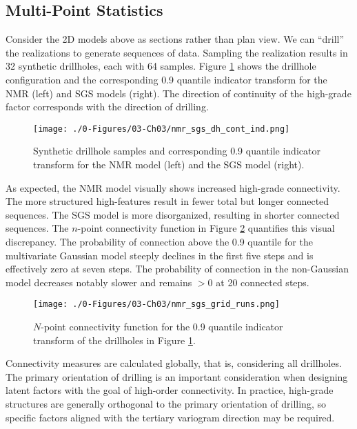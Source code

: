 \subsection{Multi-Point Statistics}
\label{subsec:03multipt}

Consider the \gls{2D} models above as sections rather than plan view. We can ``drill'' the realizations to generate sequences of data. Sampling the realization results in 32 synthetic drillholes, each with 64 samples. Figure \ref{fig:nmr_sgs_dh_cont_ind} shows the drillhole configuration and the corresponding 0.9 quantile indicator transform for the \gls{NMR} (left) and \gls{SGS} models (right). The direction of continuity of the high-grade factor corresponds with the direction of drilling.

\begin{figure}[htb!]
    \centering
    \texttt{[image: ./0-Figures/03-Ch03/nmr\_sgs\_dh\_cont\_ind.png]}
    \caption{ Synthetic drillhole samples and corresponding 0.9 quantile indicator transform for the \gls{NMR} model (left) and the \gls{SGS} model (right).}
    \label{fig:nmr_sgs_dh_cont_ind}
\end{figure}

As expected, the \gls{NMR} model visually shows increased high-grade connectivity. The more structured high-features result in fewer total but longer connected sequences. The \gls{SGS} model is more disorganized, resulting in shorter connected sequences. The $n$-point connectivity function in Figure \ref{fig:nmr_sgs_grid_runs} quantifies this visual discrepancy. The probability of connection above the 0.9 quantile for the multivariate Gaussian model steeply declines in the first five steps and is effectively zero at seven steps. The probability of connection in the non-Gaussian model decreases notably slower and remains $> 0$ at 20 connected steps.

\begin{figure}[htb!]
    \centering
    \texttt{[image: ./0-Figures/03-Ch03/nmr\_sgs\_grid\_runs.png]}
    \caption{ $N$-point connectivity function for the 0.9 quantile indicator transform of the drillholes in Figure \ref{fig:nmr_sgs_dh_cont_ind}.}
    \label{fig:nmr_sgs_grid_runs}
\end{figure}

Connectivity measures are calculated globally, that is, considering all drillholes. The primary orientation of drilling is an important consideration when designing latent factors with the goal of high-order connectivity. In practice, high-grade structures are generally orthogonal to the primary orientation of drilling, so specific factors aligned with the tertiary variogram direction may be required.


